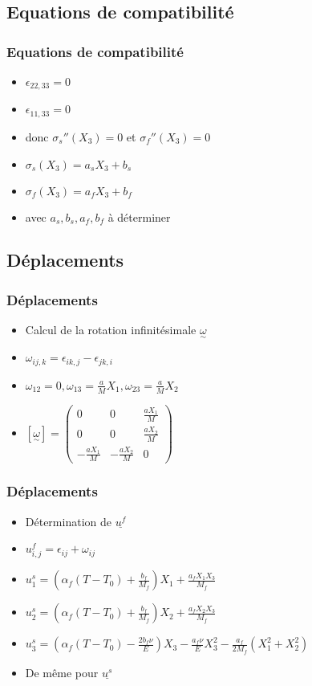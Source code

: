 \subsection{Equations de compatibilité} 
\begin{frame}
    \frametitle{Equations de compatibilité} 
    \begin{itemize}
        \item $\epsilon_{22,33}=0$
        \item $\epsilon_{11,33}=0$
        \item donc $\sigma_s''(X_3)=0$ et $\sigma_f''(X_3)=0$
        \item $\sigma_s(X_3)=a_sX_3+b_s$
        \item $\sigma_f(X_3)=a_fX_3+b_f$
        \item avec $a_s, b_s, a_f, b_f$ à déterminer
    \end{itemize}  
\end{frame}  

\subsection{Déplacements} 
\begin{frame}
    \frametitle{Déplacements} 
    \begin{itemize}
        \item Calcul de la rotation infinitésimale $\underset{\sim}{\omega}$
        \item $\omega_{ij,k}=\epsilon_{ik,j}-\epsilon_{jk,i}$
        \item $\omega_{12}=0,\omega_{13}=\frac{a}{M}X_1,\omega_{23}=\frac{a}{M}X_2$
        \item $[\underset{\sim}{\omega}]=\begin{pmatrix}0&0&\frac{aX_1}{M}\\0&0&\frac{aX_2}{M}\\-\frac{aX_1}{M}&-\frac{aX_2}{M}&0\end{pmatrix}$
    \end{itemize} 
\end{frame}  

\begin{frame}
    \frametitle{Déplacements} 
    \begin{itemize}
        \item Détermination de  $\underline{u^f}$
        \item $u_{i,j}^f=\epsilon_{ij}+\omega_{ij}$
        \item $u_1^s=(\alpha_f(T-T_0)+\frac{b_f}{M_f})X_1+\frac{a_fX_1X_3}{M_f}$
        \item $u_2^s=(\alpha_f(T-T_0)+\frac{b_f}{M_f})X_2+\frac{a_fX_2X_3}{M_f}$
        \item $u_3^s=(\alpha_f(T-T_0)-\frac{2b_f\nu}{E})X_3-\frac{a_f\nu}{E}X_3^2-\frac{a_f}{2M_f}(X_1^2+X_2^2)$
        \item De même pour $\underline{u^s}$
    \end{itemize}
\end{frame}  

